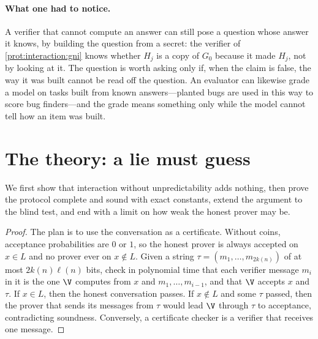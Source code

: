 \begin{refsection}
\paragraph{What one had to notice.} A verifier that cannot compute an answer can still pose a question whose answer it knows, by building the question from a secret: the verifier of \cref{prot:interaction:gni} knows whether $H_j$ is a copy of $G_0$ because it made $H_j$, not by looking at it. The question is worth asking only if, when the claim is false, the way it was built cannot be read off the question. An evaluator can likewise grade a model on tasks built from known answers---planted bugs are used in this way to score bug finders---and the grade means something only while the model cannot tell how an item was built.

\section{The theory: a lie must guess}\label{sec:interaction:theory}

We first show that interaction without unpredictability adds nothing, then prove the protocol complete and sound with exact constants, extend the argument to the blind test, and end with a limit on how weak the honest prover may be.


\begin{proof}
The plan is to use the conversation as a certificate. Without coins, acceptance probabilities are $0$ or $1$, so the honest prover is always accepted on $x\in L$ and no prover ever on $x\notin L$. Given a string $\tau=(m_1,\dots,m_{2k(n)})$ of at most $2k(n)\ell(n)$ bits, check in polynomial time that each verifier message $m_i$ in it is the one $\V$ computes from $x$ and $m_1,\dots,m_{i-1}$, and that $\V$ accepts $x$ and $\tau$. If $x\in L$, then the honest conversation passes. If $x\notin L$ and some $\tau$ passed, then the prover that sends its messages from $\tau$ would lead $\V$ through $\tau$ to acceptance, contradicting soundness. Conversely, a certificate checker is a verifier that receives one message.
\end{proof}


\end{refsection}
